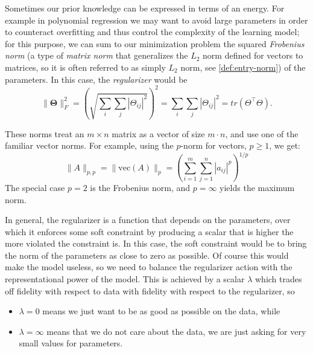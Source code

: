 
Sometimes our prior knowledge can be expressed in terms of an energy. For example in polynomial regression we may want to avoid large parameters in order to counteract overfitting and thus control the complexity of the learning model; for this purpose, we can sum to our minimization problem the squared \emph{Frobenius norm} (a type of \emph{matrix norm} that generalizes the $L_2$ norm defined for vectors to matrices, so it is often referred to as simply $L_2$ norm, see \cref{def:entry-norm}) of the parameters. In this case, the \emph{regularizer} would be
\begin{equation}
    \| \mathbf{\Theta} \|^2_F = \left( \sqrt{\sum_{i} \sum_{j} |\Theta_{ij}|^2 } \right)^2 = \sum_{i} \sum_{j} |\Theta_{ij}|^2 = tr(\Theta^{\top} \Theta).
\end{equation}

\begin{defn}\label{def:entry-norm}
    These norms treat an $m \times n$  matrix as a vector of size $m \cdot n$, and use one of the familiar vector norms. For example, using the $p$-norm for vectors, $p \geq 1$, we get:
\begin{equation}
    \displaystyle{\|A\|_{p,p}=\|\mathrm {vec} (A)\|_{p}=\left(\sum _{i=1}^{m}\sum _{j=1}^{n}|a_{ij}|^{p}\right)^{1/p}}
\end{equation}
The special case $p = 2$ is the Frobenius norm, and $p = \infty$ yields the maximum norm.

\end{defn}

In general, the regularizer is a function that depends on the parameters, over which it enforces some soft constraint by producing a scalar that is higher the more violated the constraint is. In this case, the soft constraint would be to bring the norm of the parameters as close to zero as possible. Of course this would make the model useless, so we need to balance the regularizer action with the representational power of the model. This is achieved by a scalar $\lambda$ which trades off fidelity with respect to data with fidelity with respect to the regularizer, so 
\begin{itemize}
	\item $\lambda = 0$ means we just want to be as good as possible on the data, while
	\item $\lambda = \infty$ means that we do not care about the data, we are just asking for very small values for parameters.
\end{itemize}

